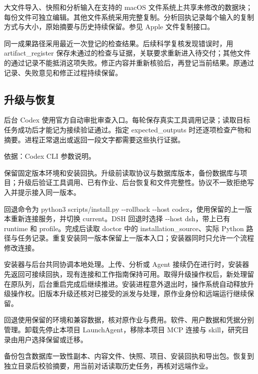 \documentclass[11pt,a4paper]{ctexart}
\begin{document}
大文件导入、快照和分析输入在支持的 macOS 文件系统上共享未修改的数据块；每份文件可独立编辑。其他文件系统采用完整复制。分析回执记录每个输入的复制方式与大小，原始摘要与历史持续保留。参见 Apple 文件复制接口。



同一成果路径采用最近一次登记的检查结果。后续科学复核发现错误时，用 artifact\_\allowbreak{}register 保存未通过的检查与证据，关联要求重新进入待交付；其他文件的通过记录不能抵消这项失败。修正内容并重新核验后，再登记当前结果。原通过记录、失败意见和修正过程持续保留。



\subsection{升级与恢复}


后台 Codex 使用官方自动审批审查入口。每轮保存真实工具调用记录；读取目标任务成功后才能记为接续验证通过。指定 expected\_\allowbreak{}outputs 时还逐项检查产物和摘要。进程正常退出或返回一段文字都需要这些执行证据。



依据：Codex CLI 参数说明。



保留固定版本环境和安装回执。升级前读取协议与数据库版本，备份数据库与项目；升级后验证工具调用、已有作业、后台恢复和文件完整性。协议不一致拒绝写入并提示接入同一版本。



回退命令为 python3 scripts/\allowbreak{}install.py -{}-rollback -{}-host codex，使用保留的上一版本重新连接服务，并切换 current。DSH 回退时选择 -{}-host dsh，带上已有 runtime 和 profile。完成后读取 doctor 中的 installation\_\allowbreak{}source、实际 Python 路径与任务记录。重复安装同一版本保留上一版本入口；安装器同时只允许一个流程修改连接。



安装器与后台共同协调本地处理。上传、分析或 Agent 接续仍在进行时，安装器先返回可接续回执，现有连接和工作指南保持可用。取得升级操作权后，新处理留在原队列，后台重启完成后继续推进。安装进程意外退出时，操作系统自动释放升级操作权。旧版本升级还核对已接受的派发与处理，原作业身份和远端运行继续保留。



回退使用保留的环境和兼容数据，核对原作业与费用。软件、用户数据和凭据分别管理。卸载先停止本项目 LaunchAgent，移除本项目 MCP 连接与 skill，研究目录由用户选择保留或迁移。



备份包含数据库一致性副本、内容文件、快照、项目、安装回执和导出包。恢复到独立目录后校验摘要，用当前对话读取历史任务，再核对远端作业。
\end{document}
